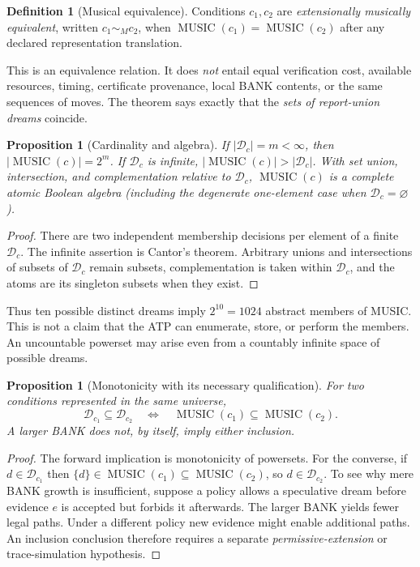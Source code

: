\documentclass[11pt,letterpaper]{article}
\newtheorem{proposition}[theorem]{Proposition}
\theoremstyle{definition}
\newtheorem{definition}[theorem]{Definition}
\theoremstyle{remark}
\newcommand{\Dream}{\mathcal{D}}
\newcommand{\Music}{\operatorname{MUSIC}}
\newcommand{\blank}{\varnothing}
\begin{document}
\begin{definition}[Musical equivalence]
Conditions $c_1,c_2$ are \emph{extensionally musically equivalent}, written $c_1\sim_M c_2$, when $\Music(c_1)=\Music(c_2)$ after any declared representation translation.
\end{definition}
This is an equivalence relation. It does \emph{not} entail equal verification cost, available resources, timing, certificate provenance, local BANK contents, or the same sequences of moves. The theorem says exactly that the \emph{sets of report-union dreams} coincide.

\begin{proposition}[Cardinality and algebra]\label{prop:algebra}
If $|\Dream_c|=m<\infty$, then $|\Music(c)|=2^m$. If $\Dream_c$ is infinite, $|\Music(c)|>|\Dream_c|$. With set union, intersection, and complementation relative to $\Dream_c$, $\Music(c)$ is a complete atomic Boolean algebra (including the degenerate one-element case when $\Dream_c=\blank$).
\end{proposition}
\begin{proof}
There are two independent membership decisions per element of a finite $\Dream_c$. The infinite assertion is Cantor's theorem. Arbitrary unions and intersections of subsets of $\Dream_c$ remain subsets, complementation is taken within $\Dream_c$, and the atoms are its singleton subsets when they exist.
\end{proof}
Thus ten possible distinct dreams imply $2^{10}=1024$ abstract members of MUSIC. This is not a claim that the ATP can enumerate, store, or perform the members. An uncountable powerset may arise even from a countably infinite space of possible dreams.

\begin{proposition}[Monotonicity with its necessary qualification]\label{prop:monotone}
For two conditions represented in the same universe,
\[
\Dream_{c_1}\subseteq\Dream_{c_2}
\quad\Longleftrightarrow\quad
\Music(c_1)\subseteq\Music(c_2).
\]
A larger BANK does \emph{not}, by itself, imply either inclusion.
\end{proposition}
\begin{proof}
The forward implication is monotonicity of powersets. For the converse, if $d\in\Dream_{c_1}$ then $\{d\}\in\Music(c_1)\subseteq\Music(c_2)$, so $d\in\Dream_{c_2}$. To see why mere BANK growth is insufficient, suppose a policy allows a speculative dream before evidence $e$ is accepted but forbids it afterwards. The larger BANK yields fewer legal paths. Under a different policy new evidence might enable additional paths. An inclusion conclusion therefore requires a separate \emph{permissive-extension} or trace-simulation hypothesis.
\end{proof}
\end{document}
